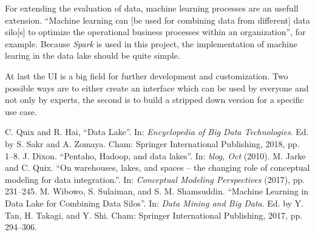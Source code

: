 \documentclass[conference]{IEEEtran}
\begin{document}
For extending the evaluation of data, machine learning processes are an usefull extension. 
``Machine learning can [be used for combining data from different] data silo[s] to 
optimize the operational business processes within an organization''\cite{Wibowo2017}, for example.
Because \textit{Spark} is used in this project, the implementation of machine learing in the data 
lake should be quite simple. 

At last the UI is a big field for further development and customization. 
Two possible ways are to either create an interface which can be used by everyone and not
only by experts, the second is to build a stripped down version for a specific use case.

\begin{thebibliography}{00}
 C. Quix and R. Hai, ``Data Lake''. In: \textit{Encyclopedia of Big Data Technologies}. Ed. by S. Sakr and
A. Zomaya. Cham: Springer International Publishing, 2018, pp. 1–8.
 J. Dixon. ``Pentaho, Hadoop, and data lakes''. In: \textit{blog, Oct} (2010).
 M. Jarke and C. Quix. ``On warehouses, lakes, and spaces – the changing role of conceptual
modeling for data integration.''. In: \textit{Conceptual Modeling Perspectives} (2017), pp. 231–245.
 M. Wibowo, S. Sulaiman, and S. M. Shamsuddin. ``Machine Learning in Data Lake 
for Combining Data Silos''. In: \textit{Data Mining and Big Data}. Ed. by Y. Tan, H. Takagi, and 
Y. Shi. Cham: Springer International Publishing, 2017, pp. 294–306.
\end{thebibliography}
\end{document}
